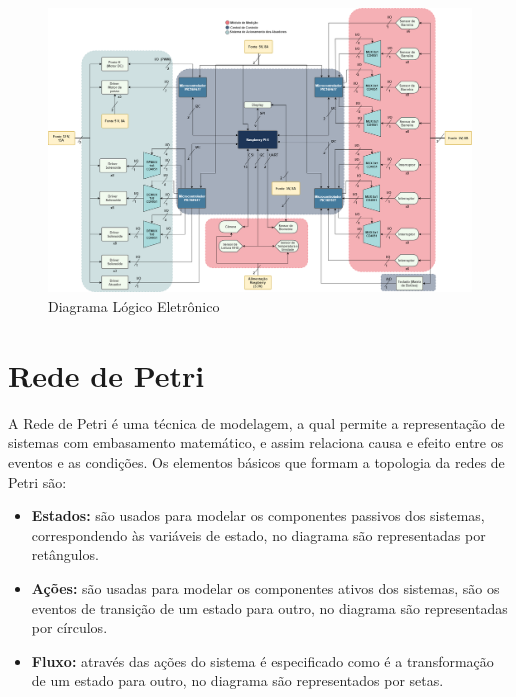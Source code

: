 \begin{figure}[H]
    \centering
    \includegraphics[width=1.1\textwidth]{figuras/fluxograma_eletronica.png}
    \caption{Diagrama Lógico Eletrônico}
    \label{fig:fluxograma_eletronica}
\end{figure}



\section{Rede de Petri}

A Rede de Petri é uma técnica de modelagem, a qual permite a representação de sistemas com embasamento matemático, e assim relaciona causa e efeito entre os eventos e as condições. Os elementos básicos que formam a topologia da redes de Petri são:
\begin{itemize}
    \item \textbf{Estados:} são usados para modelar os componentes passivos dos sistemas, correspondendo às variáveis de estado, no diagrama são representadas por retângulos.
    \item \textbf{Ações:} são usadas para modelar os componentes ativos dos sistemas, são
    os eventos de transição de um estado para outro, no diagrama são representadas por círculos.
    \item \textbf{Fluxo:} através das ações do sistema é especificado como é a transformação de um estado para outro, no diagrama são representados por setas.
\end{itemize}

